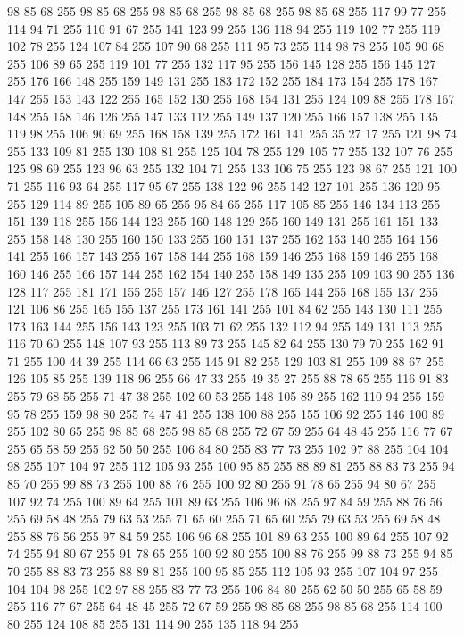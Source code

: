 98 85 68 255 98 85 68 255 98 85 68 255 98 85 68 255 98 85 68 255 117 99 77 255 114 94 71 255 110 91 67 255 141 123 99 255 136 118 94 255 119 102 77 255 119 102 78 255 124 107 84 255 107 90 68 255 111 95 73 255 114 98 78 255 105 90 68 255 106 89 65 255 119 101 77 255 132 117 95 255 156 145 128 255 156 145 127 255 176 166 148 255 159 149 131 255 183 172 152 255 184 173 154 255 178 167 147 255 153 143 122 255 165 152 130 255 168 154 131 255 124 109 88 255 178 167 148 255 158 146 126 255 147 133 112 255 149 137 120 255 166 157 138 255 135 119 98 255 106 90 69 255 168 158 139 255 172 161 141 255 35 27 17 255 121 98 74 255 133 109 81 255 130 108 81 255 125 104 78 255 129 105 77 255 132 107 76 255 125 98 69 255 123 96 63 255 132 104 71 255 133 106 75 255 123 98 67 255 121 100 71 255 116 93 64 255 117 95 67 255 138 122 96 255 142 127 101 255 136 120 95 255 129 114 89 255 105 89 65 255 95 84 65 255 117 105 85 255 146 134 113 255 151 139 118 255
156 144 123 255 160 148 129 255 160 149 131 255 161 151 133 255 158 148 130 255 160 150 133 255 160 151 137 255 162 153 140 255 164 156 141 255 166 157 143 255 167 158 144 255 168 159 146 255 168 159 146 255 168 160 146 255 166 157 144 255 162 154 140 255 158 149 135 255 109 103 90 255 136 128 117 255 181 171 155 255 157 146 127 255 178 165 144 255 168 155 137 255 121 106 86 255 165 155 137 255 173 161 141 255 101 84 62 255 143 130 111 255 173 163 144 255 156 143 123 255 103 71 62 255 132 112 94 255 149 131 113 255 116 70 60 255 148 107 93 255 113 89 73 255 145 82 64 255 130 79 70 255 162 91 71 255 100 44 39 255 114 66 63 255 145 91 82 255 129 103 81 255 109 88 67 255 126 105 85 255 139 118 96 255 66 47 33 255 49 35 27 255 88 78 65 255 116 91 83 255 79 68 55 255 71 47 38 255 102 60 53 255 148 105 89 255 162 110 94 255 159 95 78 255 159 98 80 255 74 47 41 255 138 100 88 255 155 106 92 255 146 100 89 255 102 80 65 255 98 85 68 255 98 85 68 255
72 67 59 255 64 48 45 255 116 77 67 255 65 58 59 255 62 50 50 255 106 84 80 255 83 77 73 255 102 97 88 255 104 104 98 255 107 104 97 255 112 105 93 255 100 95 85 255 88 89 81 255 88 83 73 255 94 85 70 255 99 88 73 255 100 88 76 255 100 92 80 255 91 78 65 255 94 80 67 255 107 92 74 255 100 89 64 255 101 89 63 255 106 96 68 255 97 84 59 255 88 76 56 255 69 58 48 255 79 63 53 255 71 65 60 255 71 65 60 255 79 63 53 255 69 58 48 255 88 76 56 255 97 84 59 255 106 96 68 255 101 89 63 255 100 89 64 255 107 92 74 255 94 80 67 255 91 78 65 255 100 92 80 255 100 88 76 255 99 88 73 255 94 85 70 255 88 83 73 255 88 89 81 255 100 95 85 255 112 105 93 255 107 104 97 255 104 104 98 255 102 97 88 255 83 77 73 255 106 84 80 255 62 50 50 255 65 58 59 255 116 77 67 255 64 48 45 255 72 67 59 255 98 85 68 255 98 85 68 255 114 100 80 255 124 108 85 255 131 114 90 255 135 118 94 255
